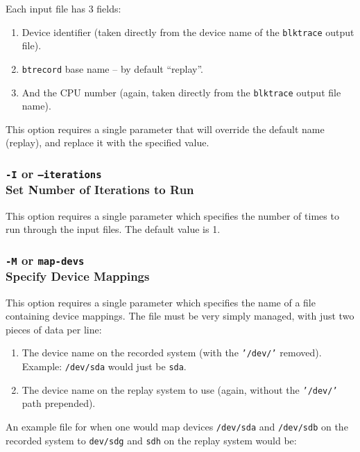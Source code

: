 \documentclass{article}
\begin{document}
Each input file has 3 fields:

\begin{enumerate}
  \item Device identifier (taken directly from the device name of the
  \texttt{blktrace} output file).

  \item \texttt{btrecord} base name -- by default ``replay''.

  \item And the CPU number (again, taken directly from the
  \texttt{blktrace} output file name).
\end{enumerate}

This option requires a single parameter that will override the default name
(replay), and replace it with the specified value.

\subsubsection{\label{sec:p-o-I}\texttt{-I} or
\texttt{--iterations}\\Set Number of Iterations to Run}

This option requires a single parameter which specifies the number of times
to run through the input files. The default value is 1.

\subsubsection{\label{sec:p-o-M}\texttt{-M} or \texttt{map-devs}\\
Specify Device Mappings}

This option requires a single parameter which specifies the name of a
file containing device mappings. The file must be very simply managed, with
just two pieces of data per line:

\begin{enumerate}
  \item The device name on the recorded system (with the \texttt{'/dev/'}
  removed). Example: \texttt{/dev/sda} would just be \texttt{sda}.

  \item The device name on the replay system to use (again, without the
  \texttt{'/dev/'} path prepended).
\end{enumerate}

An example file for when one would map devices \texttt{/dev/sda} and
\texttt{/dev/sdb} on the recorded system to \texttt{dev/sdg} and
\texttt{sdh} on the replay system would be:
\end{document}
